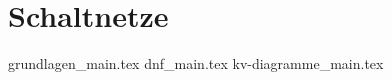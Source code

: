 
\part{Schaltnetze}
\label{part:schaltnetze}

{grundlagen_main.tex}
{dnf_main.tex}
{kv-diagramme_main.tex}